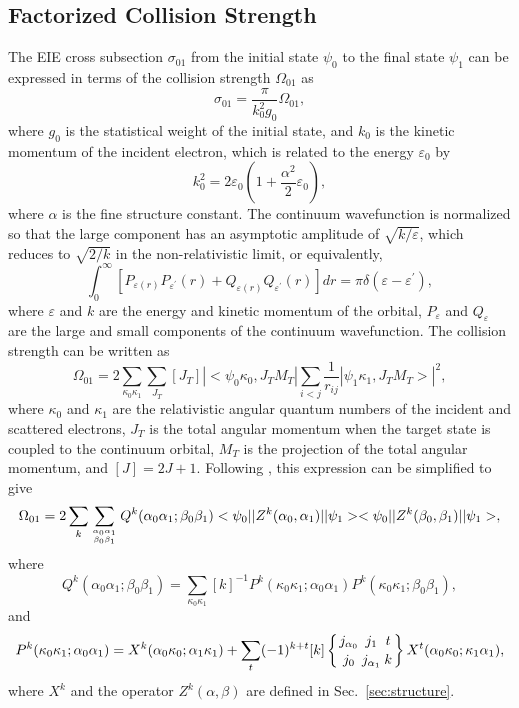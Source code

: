\subsection{Factorized Collision Strength}
The EIE cross subsection $\sigma_{01}$ from the initial state $\psi_0$ to the
final state $\psi_1$ can be expressed in terms of the collision strength
$\Omega_{01}$ as
\begin{equation}
\sigma_{01} = \frac{\pi}{k_0^2g_0}\Omega_{01},
\end{equation}
where $g_0$ is the statistical weight of the initial state, and $k_0$ is the
kinetic momentum of the incident electron, which is related to the energy
$\varepsilon_0$ by
\begin{equation}
k_0^2 = 2\varepsilon_0\left(1+\frac{\alpha^2}{2}\varepsilon_0\right),
\end{equation}
where $\alpha$ is the fine structure constant. The continuum wavefunction
is normalized so that the large component has an asymptotic amplitude of
$\sqrt{k/\varepsilon}$, which reduces to $\sqrt{2/k}$ in the non-relativistic
limit, or equivalently,
\begin{equation}
\int_0^\infty \left[P_{\varepsilon(r)}P_{\varepsilon^\prime}(r)
+Q_{\varepsilon(r)}Q_{\varepsilon^\prime}(r)\right]d r = 
\pi\delta(\varepsilon - \varepsilon^\prime),
\end{equation}
where $\varepsilon$ and $k$ are the energy and kinetic momentum of the
orbital, $P_\varepsilon$ and $Q_\varepsilon$ are the large and small
components of the continuum wavefunction. The collision strength can be
written as
\begin{equation}
\Omega_{01} = 2\sum_{\kappa_0\kappa_1}\sum_{J_T}[J_T]
|<\psi_0\kappa_0,J_TM_T|\sum_{i<j}\frac{1}{r_{ij}}|\psi_1\kappa_1,J_TM_T>|^2,
\end{equation}
where $\kappa_0$ and $\kappa_1$ are the relativistic angular quantum numbers of
the incident and scattered electrons, $J_T$ is the total angular momentum
when the target state is coupled to the continuum orbital, $M_T$ is the
projection of the total angular momentum, and  $[J] = 2J+1$. 
Following \citet{barshalom:1988a}, this expression can be simplified to give
\begin{equation}
\label{eq_cs}
\Omega_{01} = 2\sum_{k}\sum_{\alpha_0\alpha_1\atop\beta_0\beta_1}
Q^k(\alpha_0\alpha_1;\beta_0\beta_1)
<\psi_0||Z^k(\alpha_0,\alpha_1)||\psi_1>
<\psi_0||Z^k(\beta_0,\beta_1)||\psi_1>,
\end{equation}
where 
\begin{equation}
\label{eq_Qk}
Q^k(\alpha_0\alpha_1;\beta_0\beta_1) = \sum_{\kappa_0\kappa_1}[k]^{-1}
P^k(\kappa_0\kappa_1;\alpha_0\alpha_1)P^k(\kappa_0\kappa_1;\beta_0\beta_1),
\end{equation}
and 
\begin{equation}
\label{eq_Pk}
P^k(\kappa_0\kappa_1;\alpha_0\alpha_1)=
X^k(\alpha_0\kappa_0;\alpha_1\kappa_1)+\sum_{t}
(-1)^{k+t}[k]\sixj{j_{\alpha_0}}{j_1}{t}{j_0}{j_{\alpha_1}}{k}
X^t(\alpha_0\kappa_0;\kappa_1\alpha_1),
\end{equation}
where $X^k$ and the operator $Z^k(\alpha,\beta)$ are defined in
Sec.~\ref{sec:structure}. 
 

